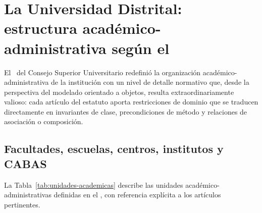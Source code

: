 \section{La Universidad Distrital: estructura académico-administrativa
  según el \acuerdo}
\label{sec:estructura-ud}

El \acuerdo\ del Consejo Superior Universitario redefinió la organización
académico-administrativa de la institución con un nivel de detalle normativo
que, desde la perspectiva del modelado orientado a objetos, resulta
extraordinariamente valioso: cada artículo del estatuto aporta restricciones
de dominio que se traducen directamente en invariantes de clase, precondiciones
de método y relaciones de asociación o composición.

\subsection{Facultades, escuelas, centros, institutos y CABAS}
\label{subsec:unidades-academicas}

La Tabla~\ref{tab:unidades-academicas} describe las unidades académico-administrativas
definidas en el \acuerdo, con referencia explícita a los artículos pertinentes.

